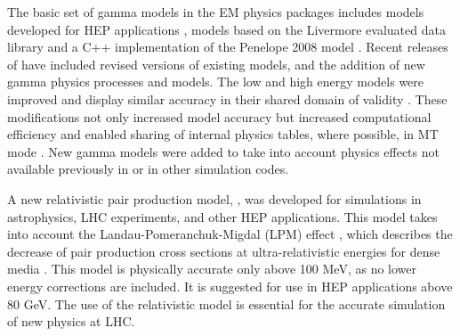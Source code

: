 The basic set of gamma models in the EM physics packages includes models
developed for HEP applications \cite{bib:G4}, models based on the Livermore
evaluated data library \cite{embib:epdl} and a C++ implementation of the 
Penelope 2008 model \cite{embib:pen}.  Recent releases of \Gfour{} have included
revised versions of existing models, and the addition of new gamma physics 
processes and models. The low and high energy models were improved and display
similar accuracy in their shared domain of validity \cite{embib:uni2}. 
These modifications not only increased model accuracy but increased 
computational efficiency and enabled sharing of internal physics tables, 
where possible, in MT mode \cite{embib:chep14}.  
New gamma models were added to take into account physics effects not available
previously in \Gfour{} or in other simulation codes. 

A new relativistic pair production model, 
, was developed for
simulations in astrophysics, 
LHC experiments, and other HEP applications.  This model takes into account 
the Landau-Pomeranchuk-Migdal (LPM) effect \cite{embib:gamma5}, which describes
the decrease of pair production cross sections at ultra-relativistic energies 
for dense media \cite{embib:gamma6}.  This model is physically accurate only
above 100 MeV, as no lower energy corrections are included.  It is suggested for
use in HEP applications above 80 GeV.  The use of the relativistic model is 
essential for the accurate simulation of new physics at LHC.

